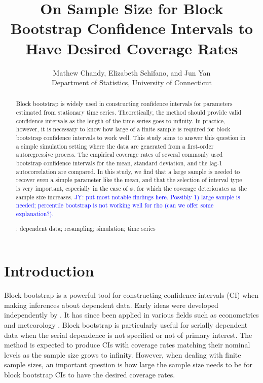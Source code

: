 \documentclass[12pt, letterpaper, titlepage]{article}
\title{On Sample Size for Block Bootstrap Confidence Intervals 
  to Have Desired Coverage Rates}
\author{Mathew Chandy, Elizabeth Schifano,
  and Jun Yan\\[1ex]
  Department of Statistics, University of Connecticut\\
}
\date{}
\newcommand{\jy}[1]{\textcolor{blue}{JY: #1}}
\begin{document}
 
\maketitle

\begin{abstract}
Block bootstrap is widely used in constructing confidence intervals for
parameters estimated from stationary time series. Theoretically, the method
should provide valid confidence intervals as the length of the time series goes
to infinity. In practice, however, it is necessary to know how large of a finite
sample is required for block bootstrap confidence intervals to work well. This
study aims to answer this question in a simple simulation setting where the data
are generated from a first-order autoregressive process. The empirical coverage
rates of several commonly used bootstrap confidence intervals for the mean,
standard deviation, and the lag-1 autocorrelation are compared. In this 
study, we find that a large sample is needed to recover even a simple
parameter like the mean, and that the selection of interval type is very
important, especially in the case of $\phi$, for which the coverage deteriorates
as the sample size increases.
\jy{put most
  notable findings here. Possibly 1) large sample is needed; percentile
  bootstrap is not working well for rho (can we offer some explanation?).}



\bigskip
{}:
dependent data; resampling; simulation; time series
\end{abstract}

\doublespace

\section{Introduction}
\label{sec:intro}

Block bootstrap is a powerful tool for constructing confidence intervals (CI)
when making inferences about dependent data. Early ideas were developed
independently by \citet{hall1985resampling, carlstein1986use, kunsch1989jackknife}.
It has since been applied in various fields such as econometrics
\citep{mackinnon2006bootstrap} and meteorology \citep{varga2017generalised}.
Block bootstrap is particularly useful for serially dependent
data when the serial dependence is not specified or not of primary interest.
The method is expected to produce CIs with coverage rates
matching their nominal levels as the sample size grows to infinity. However,
when dealing with finite sample sizes, an important question is how large the
sample size needs to be for block bootstrap CIs to have the
desired coverage rates.
\end{document}
